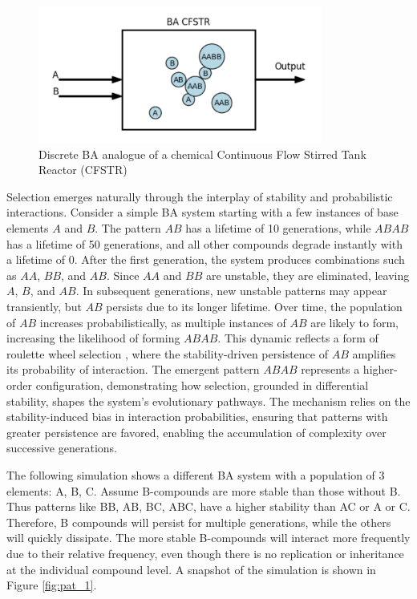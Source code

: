 \documentclass[entropy,article,submit,pdftex,moreauthors]{Definitions/mdpi}
\begin{document}
\begin{figure}[htp]
    \centering
    \includegraphics[height=4.5cm]{ba_cfstr}
    \caption{Discrete BA analogue of a chemical Continuous Flow Stirred Tank Reactor (CFSTR)}
    \label{fig:ba_cfstr}
\end{figure}

Selection emerges naturally through the interplay of stability and probabilistic interactions. Consider a simple BA system starting with a few instances of base elements \( A \) and \( B \). The pattern \( AB \) has a lifetime of 10 generations, while \( ABAB \) has a lifetime of 50 generations, and all other compounds degrade instantly with a lifetime of 0. After the first generation, the system produces combinations such as \( AA \), \( BB \), and \( AB \). Since \( AA \) and \( BB \) are unstable, they are eliminated, leaving \( A \), \( B \), and \( AB \). In subsequent generations, new unstable patterns may appear transiently, but \( AB \) persists due to its longer lifetime. Over time, the population of \( AB \) increases probabilistically, as multiple instances of \( AB \) are likely to form, increasing the likelihood of forming \( ABAB \). This dynamic reflects a form of roulette wheel selection \cite{goldberg1989genetic} \cite{holland1975adaptation}, where the stability-driven persistence of \( AB \) amplifies its probability of interaction. The emergent pattern \( ABAB \) represents a higher-order configuration, demonstrating how selection, grounded in differential stability, shapes the system's evolutionary pathways. The mechanism relies on the stability-induced bias in interaction probabilities, ensuring that patterns with greater persistence are favored, enabling the accumulation of complexity over successive generations.

The following simulation shows a different BA system with a population of 3 elements: {A, B, C}. Assume B-compounds are more stable than those without B. Thus patterns like BB, AB, BC, ABC, have a higher stability than AC or A or C. Therefore, B compounds will persist for multiple generations, while the others will quickly dissipate. The more stable B-compounds will interact more frequently due to their relative frequency, even though there is no replication or inheritance at the individual compound level. A snapshot of the simulation is shown in Figure \ref{fig:pat_1}.
\end{document}
